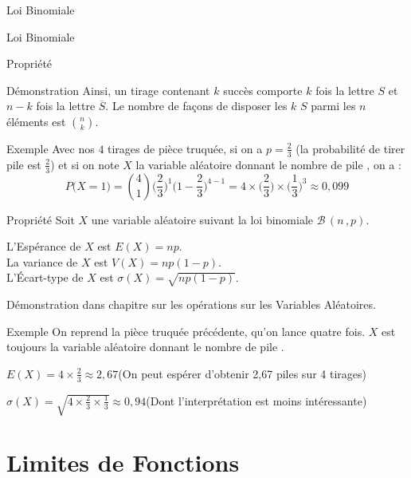 \documentclass{coursbook}
\begin{document}
\begin{Gpartie}{Loi Binomiale}
\begin{Spartie}{Loi Binomiale}
\begin{SSpartie}{Propriété}
\begin{SSSpartie}{Démonstration}
                    Ainsi, un tirage contenant $k$ succès comporte $k$ fois la lettre $S$ et $n-k$ fois la lettre $\overline{S}$. Le nombre de façons de disposer les $k$ \og $S$ \fg{} parmi les $n$ éléments est $\binom{n}{k}$.
                \end{SSSpartie}
                \begin{SSSpartie}{Exemple} 
                    Avec nos $4$ tirages de pièce truquée, si on a $p=\frac{2}{3}$ (la probabilité de tirer \og pile \fg{} est $\frac{2}{3}$) et si on note $X$ la variable aléatoire donnant le nombre de \og pile \fg{}, on a :
                    \[P\big(X=1\big)=\binom{4}{1}\Bigg(\frac{2}{3}\Bigg)^1\Bigg(1-\frac{2}{3}\Bigg)^{4-1}=4\times\Bigg(\frac{2}{3}\Bigg)\times\Bigg(\frac{1}{3}\Bigg)^3\approx 0{,}099\]
                \end{SSSpartie}
            \end{SSpartie}
            \begin{SSpartie}{Propriété} 
                Soit $X$ une variable aléatoire suivant la loi binomiale $\mathcal{B}\,\left(n\,, p\right)$.

                L'Espérance de $X$ est $\boxed{E(X)=np}$. \\ La variance de $X$ est $\boxed{V(X)=np(1-p)}$. \\ L'Écart-type de $X$ est $\boxed{\sigma(X)=\sqrt{np(1-p)}}$.

                Démonstration dans chapitre sur les opérations sur les Variables Aléatoires.
                \begin{SSSpartie}{Exemple} 
                    On reprend la pièce truquée précédente, qu'on lance quatre fois. $X$ est toujours la variable aléatoire donnant le nombre de \og pile \fg.

                    $E(X)=4\times\frac{2}{3}\approx 2{,}67$\quad (On peut espérer d'obtenir 2{,}67 piles sur 4 tirages)

                    $\sigma(X)=\sqrt{4\times\frac{2}{3}\times\frac{1}{3}}\approx 0{,}94$\quad (Dont l'interprétation est moins intéressante)
                \end{SSSpartie}
            \end{SSpartie}
        \end{Spartie}
    \end{Gpartie}



    \chapter{Limites de Fonctions}
\end{document}

